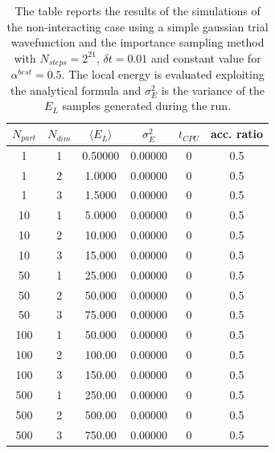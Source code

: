 \begin{table}[H]
    \centering
    \begin{tabular}{cccccc}
    $N_{part}$ & $N_{dim}$ & $\langle E_L \rangle$ & $\sigma^2_E$ & $t_{CPU}$ & acc. ratio \\
    \midrule
    1 & 1 & 0.50000 & 0.00000 & 0 & 0.5 \\
    1 & 2 & 1.0000 & 0.00000 & 0 & 0.5 \\
    1 & 3 & 1.5000 & 0.00000 & 0 & 0.5 \\
    \midrule
    10 & 1 & 5.0000 & 0.00000 & 0 & 0.5 \\
    10 & 2 & 10.000 & 0.00000 & 0 & 0.5 \\
    10 & 3 & 15.000 & 0.00000 & 0 & 0.5 \\
    \midrule
    50 & 1 & 25.000 & 0.00000 & 0 & 0.5 \\
    50 & 2 & 50.000 & 0.00000 & 0 & 0.5 \\
    50 & 3 & 75.000 & 0.00000 & 0 & 0.5 \\
    \midrule
    100 & 1 & 50.000 & 0.00000 & 0 & 0.5 \\
    100 & 2 & 100.00 & 0.00000 & 0 & 0.5 \\
    100 & 3 & 150.00 & 0.00000 & 0 & 0.5 \\
    \midrule
    500 & 1 & 250.00 & 0.00000 & 0 & 0.5 \\
    500 & 2 & 500.00 & 0.00000 & 0 & 0.5 \\
    500 & 3 & 750.00 & 0.00000 & 0 & 0.5 \\
    \bottomrule
    \end{tabular}
    \caption{The table reports the results of the simulations of the non-interacting case using a simple gaussian trial wavefunction and the importance sampling method with $N_{steps}=2^{21}$, $\delta t = 0.01$ and constant value for $\alpha^{best}=0.5$. The local energy is evaluated exploiting the analytical formula and $\sigma_E^2$ is the variance of the $E_L$ samples generated during the run. }
    \label{tab:tab_x_importance_analytical}
\end{table}


